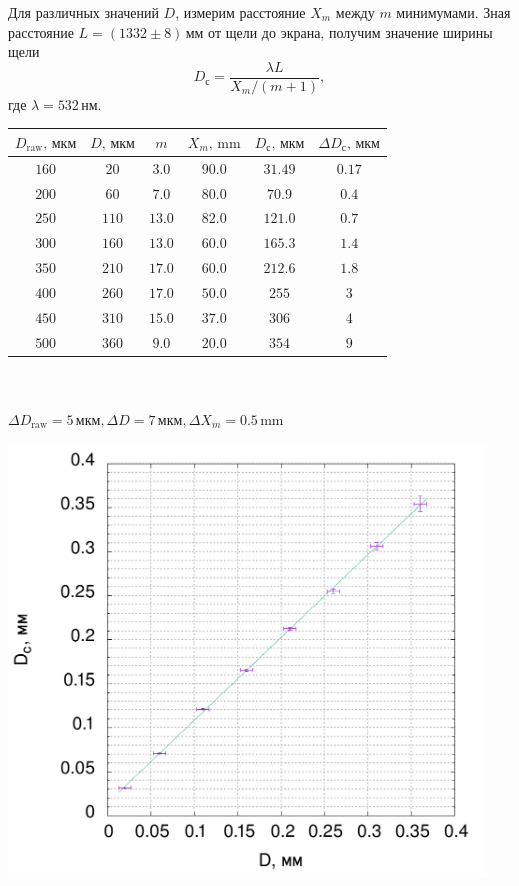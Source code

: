 Для различных значений $D$, измерим расстояние $X_m$ между $m$ минимумами. Зная расстояние $L = (1332\pm8)\,\text{мм}$ от щели до экрана, получим значение ширины щели
\[D_\text{с} = \frac{\lambda L}{X_m/(m+1)},\]
где $\lambda = 532\,\text{нм}.$

\begin{center}
\begin{tabular}{|c|c|c|c|c|c|}\hline
$D_{\text{raw}}\text{, мкм}$&$D\text{, мкм}$&$m$&$X_m\text{, mm}$&$D_\text{с}\text{, мкм}$&$\Delta D_\text{с}\text{, мкм}$\\\hline
$160$&$20$&$3.0$&$90.0$&$31.49$&$0.17$\\\hline
$200$&$60$&$7.0$&$80.0$&$70.9$&$0.4$\\\hline
$250$&$110$&$13.0$&$82.0$&$121.0$&$0.7$\\\hline
$300$&$160$&$13.0$&$60.0$&$165.3$&$1.4$\\\hline
$350$&$210$&$17.0$&$60.0$&$212.6$&$1.8$\\\hline
$400$&$260$&$17.0$&$50.0$&$255$&$3$\\\hline
$450$&$310$&$15.0$&$37.0$&$306$&$4$\\\hline
$500$&$360$&$9.0$&$20.0$&$354$&$9$\\\hline
\end{tabular}\\~\\
$\Delta D_{\text{raw}}=5\,\text{мкм}, \Delta D=7\,\text{мкм}, \Delta X_m=0.5\,\text{mm}$
\end{center}



\begin{center}
\includegraphics[width=0.95\textwidth]{plot2.png}
\end{center}

